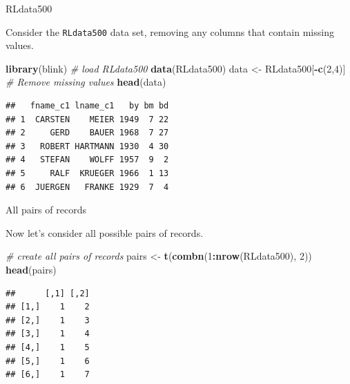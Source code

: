\documentclass[
  ignorenonframetext,
]{beamer}
\newenvironment{Shaded}{\begin{snugshade}}{\end{snugshade}}
\newcommand{\CommentTok}[1]{\textcolor[rgb]{0.56,0.35,0.01}{\textit{#1}}}
\newcommand{\DecValTok}[1]{\textcolor[rgb]{0.00,0.00,0.81}{#1}}
\newcommand{\KeywordTok}[1]{\textcolor[rgb]{0.13,0.29,0.53}{\textbf{#1}}}
\newcommand{\NormalTok}[1]{#1}
\newcommand{\OperatorTok}[1]{\textcolor[rgb]{0.81,0.36,0.00}{\textbf{#1}}}
\newcommand{\StringTok}[1]{\textcolor[rgb]{0.31,0.60,0.02}{#1}}
\begin{document}
\begin{frame}[fragile]{RLdata500}
\protect\hypertarget{rldata500}{}

Consider the \texttt{RLdata500} data set, removing any columns that
contain missing values.

\begin{Shaded}
\begin{Highlighting}[]
\KeywordTok{library}\NormalTok{(blink) }\CommentTok{# load RLdata500}
\KeywordTok{data}\NormalTok{(RLdata500)}
\NormalTok{data <-}\StringTok{ }\NormalTok{RLdata500[}\OperatorTok{-}\KeywordTok{c}\NormalTok{(}\DecValTok{2}\NormalTok{,}\DecValTok{4}\NormalTok{)] }\CommentTok{# Remove missing values}
\KeywordTok{head}\NormalTok{(data)}
\end{Highlighting}
\end{Shaded}

\begin{verbatim}
##   fname_c1 lname_c1   by bm bd
## 1  CARSTEN    MEIER 1949  7 22
## 2     GERD    BAUER 1968  7 27
## 3   ROBERT HARTMANN 1930  4 30
## 4   STEFAN    WOLFF 1957  9  2
## 5     RALF  KRUEGER 1966  1 13
## 6  JUERGEN   FRANKE 1929  7  4
\end{verbatim}

\end{frame}

\begin{frame}[fragile]{All pairs of records}
\protect\hypertarget{all-pairs-of-records}{}

Now let's consider all possible pairs of records.

\begin{Shaded}
\begin{Highlighting}[]
\CommentTok{# create all pairs of records}
\NormalTok{pairs <-}\StringTok{ }\KeywordTok{t}\NormalTok{(}\KeywordTok{combn}\NormalTok{(}\DecValTok{1}\OperatorTok{:}\KeywordTok{nrow}\NormalTok{(RLdata500), }\DecValTok{2}\NormalTok{))}
\KeywordTok{head}\NormalTok{(pairs)}
\end{Highlighting}
\end{Shaded}

\begin{verbatim}
##      [,1] [,2]
## [1,]    1    2
## [2,]    1    3
## [3,]    1    4
## [4,]    1    5
## [5,]    1    6
## [6,]    1    7
\end{verbatim}

\end{frame}
\end{document}
